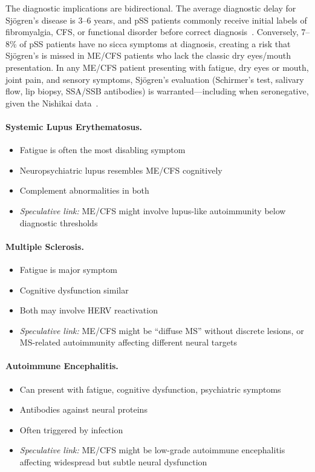 The diagnostic implications are bidirectional. The average diagnostic delay for Sjögren's disease is 3--6 years, and pSS patients commonly receive initial labels of fibromyalgia, CFS, or functional disorder before correct diagnosis~\cite{Lee2024SjogrenDiagnosis}. Conversely, 7--8\% of pSS patients have no sicca symptoms at diagnosis, creating a risk that Sjögren's is missed in ME/CFS patients who lack the classic dry eyes/mouth presentation. In any ME/CFS patient presenting with fatigue, dry eyes or mouth, joint pain, and sensory symptoms, Sjögren's evaluation (Schirmer's test, salivary flow, lip biopsy, SSA/SSB antibodies) is warranted---including when seronegative, given the Nishikai data~\cite{Nishikai1996seronegative}.

\paragraph{Systemic Lupus Erythematosus.}
\begin{itemize}
    \item Fatigue is often the most disabling symptom
    \item Neuropsychiatric lupus resembles ME/CFS cognitively
    \item Complement abnormalities in both
    \item \textit{Speculative link:} ME/CFS might involve lupus-like autoimmunity below diagnostic thresholds
\end{itemize}

\paragraph{Multiple Sclerosis.}
\begin{itemize}
    \item Fatigue is major symptom
    \item Cognitive dysfunction similar
    \item Both may involve HERV reactivation
    \item \textit{Speculative link:} ME/CFS might be ``diffuse MS'' without discrete lesions, or MS-related autoimmunity affecting different neural targets
\end{itemize}

\paragraph{Autoimmune Encephalitis.}
\begin{itemize}
    \item Can present with fatigue, cognitive dysfunction, psychiatric symptoms
    \item Antibodies against neural proteins
    \item Often triggered by infection
    \item \textit{Speculative link:} ME/CFS might be low-grade autoimmune encephalitis affecting widespread but subtle neural dysfunction
\end{itemize}

